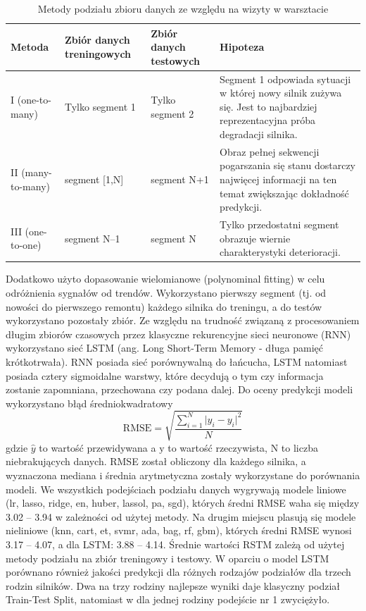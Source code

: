 \begin{table}[H]
\centering
\caption{Metody podziału zbioru danych ze względu na wizyty w warsztacie}
\label{tab:metody_podzialu}
\begin{tabular}{p{2.5cm} p{3cm} p{3cm} p{7cm}}
\hline
\textbf{Metoda} & \textbf{Zbiór danych treningowych} & \textbf{Zbiór danych testowych} & \textbf{Hipoteza} \\
\hline
I (one-to-many) 
& Tylko segment 1 
& Tylko segment 2 
& Segment 1 odpowiada sytuacji w której nowy silnik zużywa się. Jest to najbardziej reprezentacyjna próba degradacji silnika. \\
\hline
II (many-to-many) 
& segment [1,N] 
& segment N+1
& Obraz pełnej sekwencji pogarszania się stanu dostarczy najwięcej informacji na ten temat zwiększając dokładność predykcji.\\
\hline
III (one-to-one) 
& segment N--1 
& segment N 
& Tylko przedostatni segment obrazuje wiernie charakterystyki deterioracji.\\
\hline
\end{tabular}
\end{table}

Dodatkowo użyto dopasowanie wielomianowe (polynominal fitting) w celu odróżnienia sygnałów od trendów. Wykorzystano pierwszy segment (tj. od nowości do pierwszego remontu) każdego silnika do treningu, a do testów wykorzystano pozostały zbiór. Ze względu na trudność związaną z procesowaniem długim zbiorów czasowych przez klasyczne rekurencyjne sieci neuronowe (RNN) wykorzystano sieć LSTM (ang. Long Short-Term Memory - długa pamięć krótkotrwała). RNN posiada sieć porównywalną do łańcucha, LSTM natomiast posiada cztery sigmoidalne warstwy, które decydują o tym czy informacja zostanie zapomniana, przechowana czy podana dalej. 
Do oceny predykcji modeli wykorzystano błąd średniokwadratowy
\begin{equation}
    \mathrm{RMSE} = \sqrt{\frac{\sum_{i=1}^{N} \lvert \hat{y}_i - y_i \rvert^{2}}{N}}
    \label{eq:rmse}
\end{equation}
gdzie $\hat{y}$ to wartość przewidywana a $\mathrm{y}$ to wartość rzeczywista, N to liczba niebrakujących danych. RMSE został obliczony dla każdego silnika, a wyznaczona mediana i średnia arytmetyczna zostały wykorzystane do porównania modeli.
We wszystkich podejściach podziału danych wygrywają modele liniowe (lr, lasso, ridge, en, huber, lassol, pa, sgd), których średni RMSE waha się między 3.02 – 3.94 w zależności od użytej metody. Na drugim miejscu plasują się modele nieliniowe (knn, cart, et, svmr, ada, bag, rf, gbm), których średni RMSE wynosi 3.17 – 4.07, a dla LSTM: 3.88 – 4.14. Średnie wartości RSTM zależą od użytej metody podziału na zbiór treningowy i testowy.
W oparciu o model LSTM porównano również jakości predykcji dla różnych rodzajów podziałów dla trzech rodzin silników. Dwa na trzy rodziny najlepsze wyniki daje klasyczny podział Train-Test Split, natomiast w dla jednej rodziny podejście nr 1 zwyciężyło.

